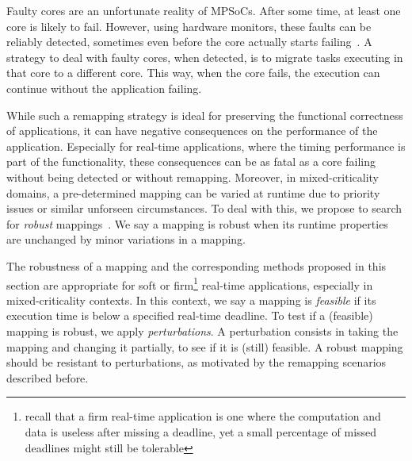Faulty cores are an unfortunate reality of \acp{MPSoC}. After some time, at least one core is likely to fail.
However, using hardware monitors, these faults can be reliably detected, sometimes even before the core actually starts failing~\cite{zhang2011dependability,zhao2019health}.
A strategy to deal with faulty cores, when detected, is to migrate tasks executing in that core to a different core.
This way, when the core fails, the execution can continue without the application failing. 

While such a remapping strategy is ideal for preserving the functional correctness of applications, it can have negative consequences on the performance of the application.
Especially for real-time applications, where the timing performance is part of the functionality, these consequences can be as fatal as a core failing without being detected or without remapping.
Moreover, in mixed-criticality domains, a pre-determined mapping can be varied at runtime due to priority issues or similar unforseen circumstances.
To deal with this, we propose to search for \emph{robust} mappings~\cite{hempel_scopes17}.
We say a mapping is robust when its runtime properties are unchanged by minor variations in a mapping.

The robustness of a mapping and the corresponding methods proposed in this section are appropriate for soft or firm\footnote{recall that a firm real-time application is one where the computation and data is useless after missing a deadline, yet a small percentage of missed deadlines might still be tolerable} real-time applications, especially in mixed-criticality contexts.
In this context, we say a mapping is \emph{feasible} if its execution time is below a specified real-time deadline.
To test if a (feasible) mapping is robust, we apply \emph{perturbations}.
A perturbation consists in taking the mapping and changing it partially, to see if it is (still) feasible.
A robust mapping should be resistant to perturbations, as motivated by the remapping scenarios described before.

